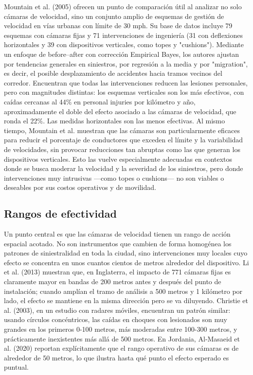 Mountain et al. (2005) ofrecen un punto de comparación útil al analizar no solo cámaras de velocidad, sino un conjunto amplio de esquemas de gestión de velocidad en vías urbanas con límite de 30 mph. Su base de datos incluye 79 esquemas con cámaras fijas y 71 intervenciones de ingeniería (31 con deflexiones horizontales y 39 con dispositivos verticales, como topes y "cushions"). Mediante un enfoque de before–after con corrección Empirical Bayes, los autores ajustan por tendencias generales en siniestros, por regresión a la media y por "migration", es decir, el posible desplazamiento de accidentes hacia tramos vecinos del corredor. Encuentran que todas las intervenciones reducen las lesiones personales, pero con magnitudes distintas: los esquemas verticales son los más efectivos, con caídas cercanas al 44\% en personal injuries por kilómetro y año, aproximadamente el doble del efecto asociado a las cámaras de velocidad, que ronda el 22\%. Las medidas horizontales son las menos efectivas. Al mismo tiempo, Mountain et al. muestran que las cámaras son particularmente eficaces para reducir el porcentaje de conductores que exceden el límite y la variabilidad de velocidades, sin provocar reducciones tan abruptas como las que generan los dispositivos verticales. Esto las vuelve especialmente adecuadas en contextos donde se busca moderar la velocidad y la severidad de los siniestros, pero donde intervenciones muy intrusivas ---como topes o cushions--- no son viables o deseables por sus costos operativos y de movilidad.\\ 

\subsection{Rangos de efectividad}
\noindent Un punto central es que las cámaras de velocidad tienen un rango de acción espacial acotado. No son instrumentos que cambien de forma homogénea los patrones de siniestralidad en toda la ciudad, sino intervenciones muy locales cuyo efecto se concentra en unos cuantos cientos de metros alrededor del dispositivo. Li et al. (2013) muestran que, en Inglaterra, el impacto de 771 cámaras fijas es claramente mayor en bandas de 200 metros antes y después del punto de instalación; cuando amplían el tramo de análisis a 500 metros y 1 kilómetro por lado, el efecto se mantiene en la misma dirección pero se va diluyendo. Christie et al. (2003), en un estudio con radares móviles, encuentran un patrón similar: usando círculos concéntricos, las caídas en choques con lesionados son muy grandes en los primeros 0-100 metros, más moderadas entre 100-300 metros, y prácticamente inexistentes más allá de 500 metros. En Jordania, Al‑Masaeid et al. (2020) reportan explícitamente que el rango operativo de sus cámaras es de alrededor de 50 metros, lo que ilustra hasta qué punto el efecto esperado es puntual.

